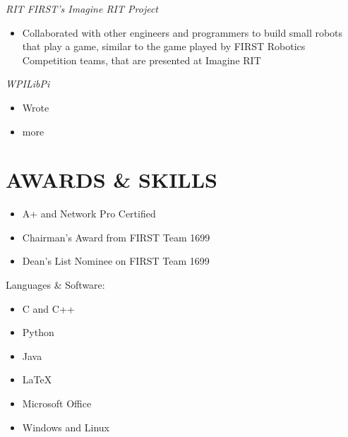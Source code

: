 \documentclass[line,margin]{res}
\begin{document}
\begin{resume}
	\vspace{-8pt}
	{\sl RIT FIRST's Imagine RIT Project}
		\begin{itemize}
			\itemsep 0pt
			\item Collaborated with other engineers and programmers to build small robots that play a game, similar to the game played by FIRST Robotics Competition teams, that are presented at Imagine RIT 
		\end{itemize}
	\vspace{-8pt}
	{\sl WPILibPi}
		\begin{itemize}
			\itemsep 0pt
			\item Wrote 
			\item more
		\end{itemize}

\section{AWARDS \& SKILLS} 
		\begin{multicols}{2}
			\begin{itemize}
				\itemsep -2pt
				\item[] A+ and Network Pro Certified
				\item[] Chairman's Award from FIRST Team 1699
				\item[] Dean's List Nominee on FIRST Team 1699

			\end{itemize}
		\end{multicols}	
	\vspace{-8pt}
	{Languages \& Software:} %
		\begin{multicols}{2}
			\begin{itemize}
				\itemsep -2pt
				\item[] C and C++
				\item[] Python
				\item[] Java
				\item[] \LaTeX
				\item[] Microsoft Office
				\item[] Windows and Linux
			\end{itemize}
		\end{multicols}


\end{resume}
\end{document}
